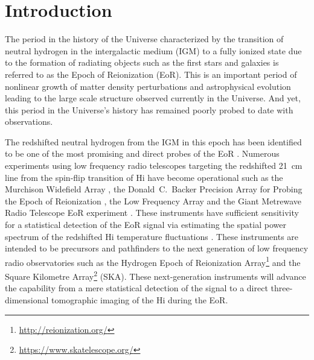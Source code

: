 \documentclass[preprint2,iop,numberedappendix,twocolappendix,appendixfloats]{emulateapj}
\begin{document}

\begin{abstract}

\end{abstract}
 

\section{Introduction}\label{intro}

The period in the history of the Universe characterized by the transition of neutral hydrogen in the intergalactic medium (IGM) to a fully ionized state due to the formation of radiating objects such as the first stars and galaxies is referred to as the Epoch of Reionization (EoR). This is an important period of nonlinear growth of matter density perturbations and astrophysical evolution leading to the large scale structure observed currently in the Universe. And yet, this period in the Universe's history has remained poorly probed to date with observations. 

The redshifted neutral hydrogen from the IGM in this epoch has been identified to be one of the most promising and direct probes of the EoR \citep{sun72,sco90,mad97,toz00,ili02}. Numerous experiments using low frequency radio telescopes targeting the redshifted 21~cm line from the spin-flip transition of H{\sc i} have become operational such as the Murchison Widefield Array \citep[MWA;][]{lon09,bow13,tin13}, the Donald~C.~Backer Precision Array for Probing the Epoch of Reionization \citep[PAPER;][]{par10}, the Low Frequency Array \citep[LOFAR;][]{van13} and the Giant Metrewave Radio Telescope EoR experiment \citep[GMRT;][]{pac13}. These instruments have sufficient sensitivity for a statistical detection of the EoR signal via estimating the spatial power spectrum of the redshifted H{\sc i} temperature fluctuations \citep{bea13,thy13}. These instruments are intended to be precursors and pathfinders to the next generation of low frequency radio observatories such as the Hydrogen Epoch of Reionization Array\footnote{\url{http://reionization.org/}} \citep[HERA;][]{deb16} and the Square Kilometre Array\footnote{\url{https://www.skatelescope.org/}} (SKA). These next-generation instruments will advance the capability from a mere statistical detection of the signal to a direct three-dimensional tomographic imaging of the H{\sc i} during the EoR. 
\end{document}
